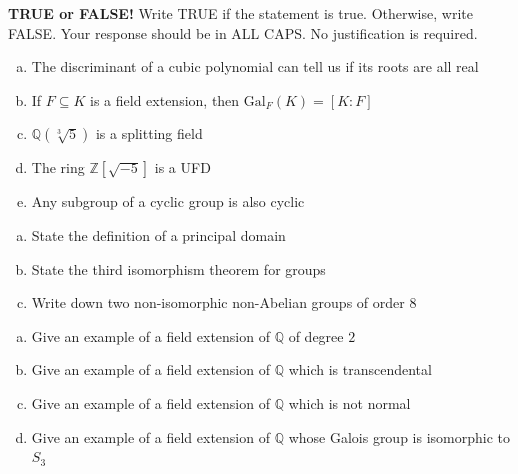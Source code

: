\documentclass[11pt]{exam}
\theoremstyle{definition}
\begin{document}
%
%
%

\begin{questions}

\addpoints

\question[10]\mbox{}
\textbf{TRUE or FALSE!}  Write  TRUE if the statement is true.  Otherwise, write FALSE.  Your response should be in ALL CAPS.  No justification is required.
\begin{enumerate}[(a)]
\item  
The discriminant of a cubic polynomial can tell us if its roots are all real
\vspace{1.3in}
\item  
If $F\subseteq K$ is a field extension, then $\text{Gal}_F(K) = [K:F]$
\vspace{1.3in}
\item  
$\mathbb Q(\sqrt[3]{5})$ is a splitting field
\vspace{1.3in}
\item  
The ring $\mathbb Z[\sqrt{-5}]$ is a UFD
\vspace{1.3in}
\item  
Any subgroup of a cyclic group is also cyclic
\vspace{1.3in}
\end{enumerate}

\newpage
\question[10]\mbox{}

\begin{enumerate}[(a)]
\item State the definition of a principal domain
\vspace{3in}
\item State the third isomorphism theorem for groups
\vspace{3in}
\item Write down two non-isomorphic non-Abelian groups of order $8$
\end{enumerate}

\newpage
\question[10]\mbox{}
\begin{enumerate}[(a)]
\item  Give an example of a field extension of $\mathbb Q$ of degree $2$
\vspace{2in}
\item  Give an example of a field extension of $\mathbb Q$ which is transcendental
\vspace{2in}
\item  Give an example of a field extension of $\mathbb Q$ which is not normal
\vspace{2in}
\item  Give an example of a field extension of $\mathbb Q$ whose Galois group is isomorphic to $S_3$
\end{enumerate}


\end{questions}
\end{document}
